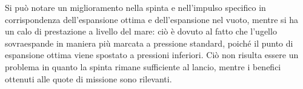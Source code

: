 Si può notare un miglioramento nella spinta e nell'impulso specifico in corrispondenza dell'espansione ottima e dell'espansione nel vuoto, mentre si ha un calo di prestazione a livello del mare: ciò è dovuto al fatto che l'ugello sovraespande in maniera più marcata a pressione standard, poiché il punto di espansione ottima viene spostato a pressioni inferiori. Ciò non risulta essere un problema in quanto la spinta rimane sufficiente al lancio, mentre i benefici ottenuti alle quote di missione sono rilevanti.